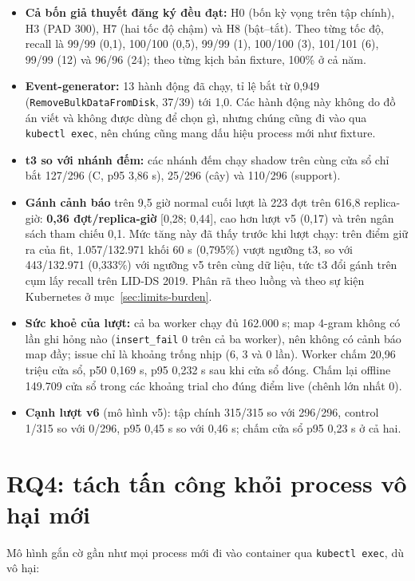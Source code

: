\begin{itemize}
\tightlist
\item
  \textbf{Cả bốn giả thuyết đăng ký đều đạt:} H0 (bốn kỳ vọng trên tập chính), H3 (PAD 300), H7 (hai tốc độ chậm) và H8 (bật--tắt). Theo từng tốc độ, recall là 99/99 (0,1), 100/100 (0,5), 99/99 (1), 100/100 (3), 101/101 (6), 99/99 (12) và 96/96 (24); theo từng kịch bản fixture, 100\% ở cả năm.
\item
  \textbf{Event-generator:} 13 hành động đã chạy, tỉ lệ bắt từ 0,949 (\texttt{Remove\allowbreak{}Bulk\allowbreak{}Data\allowbreak{}From\allowbreak{}Disk}, 37/39) tới 1,0. Các hành động này không do đồ án viết và không được dùng để chọn gì, nhưng chúng cũng đi vào qua \texttt{kubectl exec}, nên chúng cũng mang dấu hiệu process mới như fixture.
\item
  \textbf{t3 so với nhánh đếm:} các nhánh đếm chạy shadow trên cùng cửa sổ chỉ bắt 127/296 (C, p95 3,86 s), 25/296 (cây) và 110/296 (support).
\item
  \textbf{Gánh cảnh báo} trên 9,5 giờ normal cuối lượt là 223 đợt trên 616,8 replica-giờ: \textbf{0,36 đợt/replica-giờ} {[}0,28; 0,44{]}, cao hơn lượt v5 (0,17) và trên ngân sách tham chiếu 0,1. Mức tăng này đã thấy trước khi lượt chạy: trên điểm giữ ra của fit, 1.057/132.971 khối 60 s (0,795\%) vượt ngưỡng t3, so với 443/132.971 (0,333\%) với ngưỡng v5 trên cùng dữ liệu, tức t3 đổi gánh trên cụm lấy recall trên LID-DS 2019. Phân rã theo luồng và theo sự kiện Kubernetes ở mục~\ref{sec:limits-burden}.
\item
  \textbf{Sức khoẻ của lượt:} cả ba worker chạy đủ 162.000 s; map 4-gram không có lần ghi hỏng nào (\texttt{insert\_fail} 0 trên cả ba worker), nên không có cảnh báo map đầy; issue chỉ là khoảng trống nhịp (6, 3 và 0 lần). Worker chấm 20,96 triệu cửa sổ, p50 0,169 s, p95 0,232 s sau khi cửa sổ đóng. Chấm lại offline 149.709 cửa sổ trong các khoảng trial cho đúng điểm live (chênh lớn nhất 0).
\item
  \textbf{Cạnh lượt v6} (mô hình v5): tập chính 315/315 so với 296/296, control 1/315 so với 0/296, p95 0,45 s so với 0,46 s; chấm cửa sổ p95 0,23 s ở cả hai.
\end{itemize}

\section{RQ4: tách tấn công khỏi process vô hại mới}\label{sec:benign}

Mô hình gắn cờ gần như mọi process mới đi vào container qua \texttt{kubectl exec}, dù vô hại:


